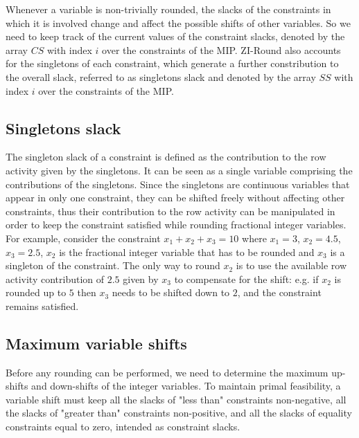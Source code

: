 \documentclass[a4paper,12pt,twoside]{scrbook}
\begin{document}
Whenever a variable is non-trivially rounded, the slacks of the constraints in which it is involved change and affect the possible shifts of other variables. So we need to keep track of the current values of the constraint slacks, denoted by the array $CS$ with index $i$ over the constraints of the MIP.
ZI-Round also accounts for the singletons of each constraint, which generate a further constribution to the overall slack, referred to as singletons slack and denoted by the array $SS$ with index $i$ over the constraints of the MIP. \par 

\subsection{Singletons slack}
The singleton slack of a constraint is defined as the contribution to the row activity given by the singletons. It can be seen as a single variable comprising the contributions of the singletons. 
Since the singletons are continuous variables that appear in only one constraint, they can be shifted freely without affecting other constraints, thus their contribution to the row activity can be manipulated in order to keep the constraint satisfied while rounding fractional integer variables. For example, consider the constraint $x_1 + x_2 + x_3 = 10$ where $x_1 = 3$, $x_2 = 4.5$, $x_3 = 2.5$, $x_2$ is the fractional integer variable that has to be rounded and $x_3$ is a singleton of the constraint. The only way to round $x_2$ is to use the available row activity contribution of $2.5$ given by $x_3$ to compensate for the shift: e.g. if $x_2$ is rounded up to $5$ then $x_3$ needs to be shifted down to $2$, and the constraint remains satisfied. \par 

\subsection{Maximum variable shifts}
Before any rounding can be performed, we need to determine the maximum up-shifts and down-shifts of the integer variables. To maintain primal feasibility, a variable shift must keep all the slacks of "less than" constraints non-negative, all the slacks of "greater than" constraints non-positive, and all the slacks of equality constraints equal to zero, intended as constraint slacks. \par
\end{document}
